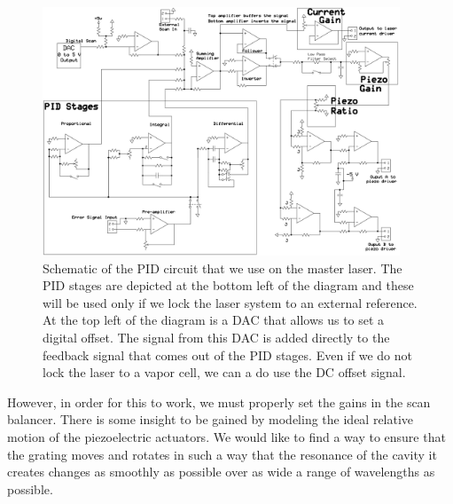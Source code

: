 \begin{figure}
\centerline{
\includegraphics[width=0.95\textwidth]{PIDfromCJEdiss}}
\caption[Schematic of PID circuit]{\label{circuit} Schematic of the PID circuit that we use on the master laser. The PID stages are depicted at the bottom left of the diagram and these will be used only if we lock the laser system to an external reference. At the top left of the diagram is a DAC that allows us to set a digital offset. The signal from this DAC is added directly to the feedback signal that comes out of the PID stages. Even if we do not lock the laser to a vapor cell, we can a do use the DC offset signal. }
\end{figure}


However, in order for this to work, we must properly set the gains in the scan balancer. There is some insight to be gained by modeling the ideal relative motion of the piezoelectric actuators. We would like to find a way to ensure that the grating moves and rotates in such a way that the resonance of the cavity it creates changes as smoothly as possible over as wide a range of wavelengths as possible. 

